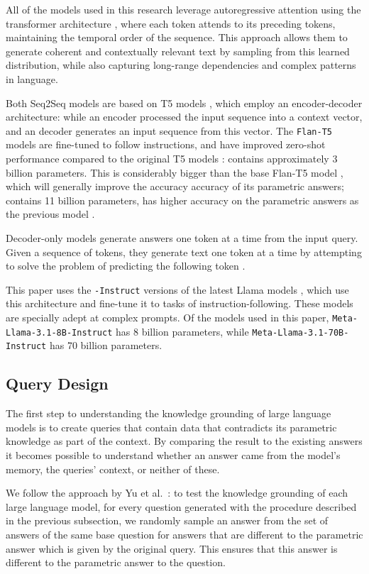 All of the models used in this research leverage autoregressive attention using the transformer architecture \cite{attention_is_all_you_need}, where each token attends to its preceding tokens, maintaining the temporal order of the sequence.
This approach allows them to generate coherent and contextually relevant text by sampling from this learned distribution, while also capturing long-range dependencies and complex patterns in language.

Both Seq2Seq models are based on T5 models \cite{t5}, which employ an encoder-decoder architecture: while an encoder processed the input sequence into a context vector, and an decoder generates an input sequence from this vector.
The \texttt{Flan-T5} models are fine-tuned to follow instructions, and have improved zero-shot performance compared to the original T5 models \cite{flant5}:
\smallflan{} contains approximately 3 billion parameters.
This is considerably bigger than the base Flan-T5 model \cite{flant5}, which will generally improve the accuracy accuracy of its parametric answers; \bigflan{} contains 11 billion parameters, has higher accuracy on the parametric answers as the previous model \cite{flant5}.

Decoder-only models generate answers one token at a time from the input query.
Given a sequence of tokens, they generate text one token at a time by attempting to solve the problem of predicting the following token \cite{gpt}.

This paper uses the \texttt{-Instruct} versions of the latest Llama models \cite{llama3}, which use this architecture and fine-tune it to tasks of instruction-following.
These models are specially adept at complex prompts.
Of the models used in this paper, \texttt{Meta-Llama-3.1-8B-Instruct} has 8 billion parameters, while \texttt{Meta-Llama-3.1-70B-Instruct} has 70 billion parameters.

\subsection{Query Design}
\label{query_design}

The first step to understanding the knowledge grounding of large language models is to create queries that contain data that contradicts its parametric knowledge as part of the context.
By comparing the result to the existing answers it becomes possible to understand whether an answer came from the model's memory, the queries' context, or neither of these.

We follow the approach by Yu et al.\ \cite{factual_recall}: to test the knowledge grounding of each large language model, for every question generated with the procedure described in the previous subsection, we randomly sample an answer from the set of answers of the same base question for answers that are different to the parametric answer which is given by the original query.
This ensures that this answer is different to the parametric answer to the question.

